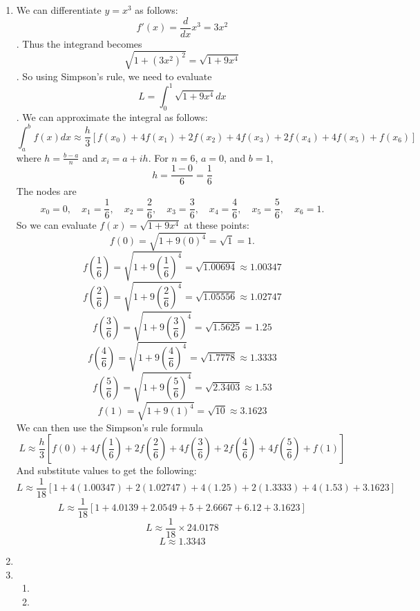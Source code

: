 \documentclass[12pt]{article}
\begin{document}
\begin{enumerate}[leftmargin=2em]
    \item We can differentiate $y=x^{3}$ as follows:
    \[ f'(x) = \frac{d}{dx}x^{3} = 3x^{2}\].
    Thus the integrand becomes 
    \[\sqrt{1+(3x^{2})^{2}} = \sqrt{1+9x^{4}}\].
    So using Simpson's rule, we need to evaluate 
    \[L = \int_{0}^{1}\sqrt{1+9x^{4}}dx\].
    We can approximate the integral as follows:
    \[\int_{a}^{b}f(x)dx \approx \frac{h}{3}[f(x_0)+4f(x_1)+2f(x_2)+4f(x_3)+2f(x_4)+4f(x_5)+f(x_6)]\]
    where $h = \frac{b-a}{n}$ and $x_i = a+ih$.
    For $n=6$, $a=0$, and $b=1$,
    \[h=\frac{1-0}{6} = \frac{1}{6}\]
    The nodes are
    \[x_0 = 0, \quad x_1 = \frac{1}{6}, \quad x_2 = \frac{2}{6}, \quad x_3 = \frac{3}{6}, \quad x_4 = \frac{4}{6}, \quad x_5 = \frac{5}{6}, \quad x_6 = 1.\]
    So we can evaluate $f(x) = \sqrt{1+9x^4}$ at these points:
    \[f(0) = \sqrt{1 + 9(0)^4} = \sqrt{1} = 1.\]
    \[f\left(\frac{1}{6}\right) = \sqrt{1 + 9\left(\frac{1}{6}\right)^4} = \sqrt{1.00694} \approx 1.00347\]
    \[f\left(\frac{2}{6}\right) = \sqrt{1 + 9\left(\frac{2}{6}\right)^4} = \sqrt{1.05556} \approx 1.02747\]
    \[f\left(\frac{3}{6}\right) = \sqrt{1 + 9\left(\frac{3}{6}\right)^4} = \sqrt{1.5625} = 1.25\]
    \[f\left(\frac{4}{6}\right) = \sqrt{1 + 9\left(\frac{4}{6}\right)^4} = \sqrt{1.7778} \approx 1.3333\]
    \[f\left(\frac{5}{6}\right) = \sqrt{1 + 9\left(\frac{5}{6}\right)^4} = \sqrt{2.3403} \approx 1.53\]
    \[f(1) = \sqrt{1 + 9(1)^4} = \sqrt{10} \approx 3.1623\]
    We can then use the Simpson's rule formula
    \[L \approx \frac{h}{3} \left[ f(0) + 4f\left(\frac{1}{6}\right) + 2f\left(\frac{2}{6}\right) + 4f\left(\frac{3}{6}\right) + 2f\left(\frac{4}{6}\right) + 4f\left(\frac{5}{6}\right) + f(1) \right]\]
    And substitute values to get the following:
    \[L \approx \frac{1}{18} \left[ 1 + 4(1.00347) + 2(1.02747) + 4(1.25) + 2(1.3333) + 4(1.53) + 3.1623 \right]\]
    \[L \approx \frac{1}{18} \left[ 1 + 4.0139 + 2.0549 + 5 + 2.6667 + 6.12 + 3.1623 \right]\]
    \[L \approx \frac{1}{18} \times 24.0178\]
    \[L \approx 1.3343\]


    \item 

    \item
    \begin{enumerate}[leftmargin=!]
        \item 

        \item 
    \end{enumerate}
    

\end{enumerate}
\end{document}
